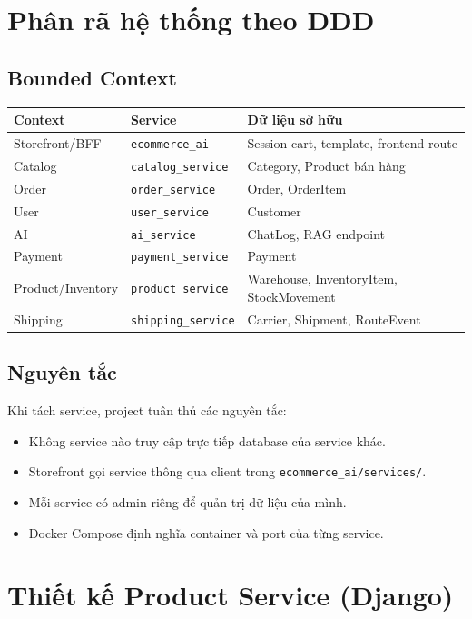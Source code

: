 \documentclass[12pt,a4paper]{report}
\begin{document}
\section{Phân rã hệ thống theo DDD}

\subsection{Bounded Context}

\begin{longtable}{|p{4cm}|p{5cm}|p{5cm}|}
\hline
\textbf{Context} & \textbf{Service} & \textbf{Dữ liệu sở hữu} \\
\hline
Storefront/BFF & \texttt{ecommerce\_ai} & Session cart, template, frontend route \\
\hline
Catalog & \texttt{catalog\_service} & Category, Product bán hàng \\
\hline
Order & \texttt{order\_service} & Order, OrderItem \\
\hline
User & \texttt{user\_service} & Customer \\
\hline
AI & \texttt{ai\_service} & ChatLog, RAG endpoint \\
\hline
Payment & \texttt{payment\_service} & Payment \\
\hline
Product/Inventory & \texttt{product\_service} & Warehouse, InventoryItem, StockMovement \\
\hline
Shipping & \texttt{shipping\_service} & Carrier, Shipment, RouteEvent \\
\hline
\end{longtable}

\subsection{Nguyên tắc}

Khi tách service, project tuân thủ các nguyên tắc:

\begin{itemize}
  \item Không service nào truy cập trực tiếp database của service khác.
  \item Storefront gọi service thông qua client trong \texttt{ecommerce\_ai/services/}.
  \item Mỗi service có admin riêng để quản trị dữ liệu của mình.
  \item Docker Compose định nghĩa container và port của từng service.
\end{itemize}

\section{Thiết kế Product Service (Django)}
\end{document}
